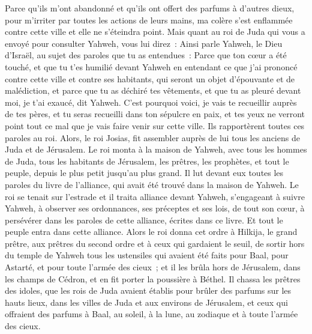 \begin{multicols}{2}
Parce qu'ils m'ont abandonné et qu'ils ont offert des parfums à d'autres dieux, pour m'irriter par toutes les actions de leurs mains, ma colère s'est enflammée contre cette ville et elle ne s'éteindra point.
Mais quant au roi de Juda qui vous a envoyé pour consulter Yahweh, vous lui direz~: Ainsi parle Yahweh, le Dieu d'Israël, au sujet des paroles que tu as entendues~:
Parce que ton cœur a été touché, et que tu t'es humilié devant Yahweh en entendant ce que j'ai prononcé contre cette ville et contre ses habitants, qui seront un objet d'épouvante et de malédiction, et parce que tu as déchiré tes vêtements, et que tu as pleuré devant moi, je t'ai exaucé, dit Yahweh.
C'est pourquoi voici, je vais te recueillir auprès de tes pères, et tu seras recueilli dans ton sépulcre en paix, et tes yeux ne verront point tout ce mal que je vais faire venir sur cette ville. Ils rapportèrent toutes ces paroles au roi.
\VerseOne{}Alors, le roi Josias, fit assembler auprès de lui tous les anciens de Juda et de Jérusalem.
Le roi monta à la maison de Yahweh, avec tous les hommes de Juda, tous les habitants de Jérusalem, les prêtres, les prophètes, et tout le peuple, depuis le plus petit jusqu'au plus grand. Il lut devant eux toutes les paroles du livre de l'alliance, qui avait été trouvé dans la maison de Yahweh.
Le roi se tenait sur l'estrade et il traita alliance devant Yahweh, s'engageant à suivre Yahweh, à observer ses ordonnances, ses préceptes et ses lois, de tout son cœur, à persévérer dans les paroles de cette alliance, écrites dans ce livre. Et tout le peuple entra dans cette alliance.
Alors le roi donna cet ordre à Hilkija, le grand prêtre, aux prêtres du second ordre et à ceux qui gardaient le seuil, de sortir hors du temple de Yahweh tous les ustensiles qui avaient été faits pour Baal, pour Astarté, et pour toute l'armée des cieux~; et il les brûla hors de Jérusalem, dans les champs de Cédron, et en fit porter la poussière à Béthel.
Il chassa les prêtres des idoles, que les rois de Juda avaient établis pour brûler des parfums sur les hauts lieux, dans les villes de Juda et aux environs de Jérusalem, et ceux qui offraient des parfums à Baal, au soleil, à la lune, au zodiaque et à toute l'armée des cieux.

\end{multicols}
